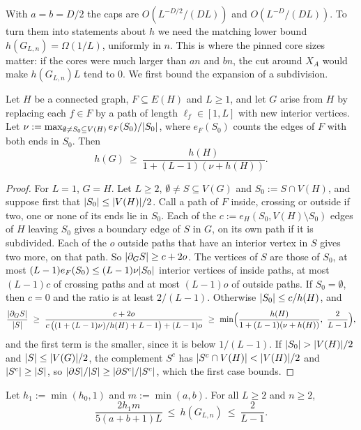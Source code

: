 With $a=b=D/2$ the caps are $O(L^{-D/2}/(DL))$ and $O(L^{-D}/(DL))$. To turn them into statements about $h$ we need the matching lower bound $h(G_{L,n})=\Omega(1/L)$, uniformly in $n$. This is where the pinned core sizes matter: if the cores were much larger than $an$ and $bn$, the cut around $X_A$ would make $h(G_{L,n})L$ tend to $0$. We first bound the expansion of a subdivision.

\begin{lemma}\label{lem:subdivide}
Let $H$ be a connected graph, $F\subseteq E(H)$ and $L\ge1$, and let $G$ arise from $H$ by replacing each $f\in F$ by a path of length $\ell_f\in[1,L]$ with new interior vertices. Let $\nu:=\max_{\emptyset\ne S_0\subseteq V(H)}e_F(S_0)/\lvert S_0\rvert$, where $e_F(S_0)$ counts the edges of $F$ with both ends in $S_0$. Then
\[
  h(G)\ \ge\ \frac{h(H)}{1+(L-1)(\nu+h(H))} .
\]
\end{lemma}

\begin{proof}
For $L=1$, $G=H$. Let $L\ge2$, $\emptyset\ne S\subseteq V(G)$ and $S_0:=S\cap V(H)$, and suppose first that $\lvert S_0\rvert\le\lvert V(H)\rvert/2$. Call a path of $F$ inside, crossing or outside if two, one or none of its ends lie in $S_0$. Each of the $c:=e_H(S_0,V(H)\setminus S_0)$ edges of $H$ leaving $S_0$ gives a boundary edge of $S$ in $G$, on its own path if it is subdivided. Each of the $o$ outside paths that have an interior vertex in $S$ gives two more, on that path. So $\lvert \partial_GS\rvert\ge c+2o$. The vertices of $S$ are those of $S_0$, at most $(L-1)e_F(S_0)\le(L-1)\nu\lvert S_0\rvert$ interior vertices of inside paths, at most $(L-1)c$ of crossing paths and at most $(L-1)o$ of outside paths. If $S_0=\emptyset$, then $c=0$ and the ratio is at least $2/(L-1)$. Otherwise $\lvert S_0\rvert\le c/h(H)$, and
\[
  \frac{\abs{\partial_GS}}{\abs S}\ \ge\ \frac{c+2o}{c\,\bigl((1+(L-1)\nu)/h(H)+L-1\bigr)+(L-1)o}\ \ge\ \min\Bigl(\frac{h(H)}{1+(L-1)(\nu+h(H))},\ \frac2{L-1}\Bigr),
\]
and the first term is the smaller, since it is below $1/(L-1)$. If $\lvert S_0\rvert>\lvert V(H)\rvert/2$ and $\lvert S\rvert\le\lvert V(G)\rvert/2$, the complement $S^c$ has $\lvert S^c\cap V(H)\rvert<\lvert V(H)\rvert/2$ and $\lvert S^c\rvert\ge\lvert S\rvert$, so $\lvert \partial S\rvert/\lvert S\rvert\ge\lvert \partial S^c\rvert/\lvert S^c\rvert$, which the first case bounds.
\end{proof}

\begin{proposition}\label{prop:hub-expansion}
Let $h_1:=\min(h_0,1)$ and $m:=\min(a,b)$. For all $L\ge2$ and $n\ge2$,
\[
  \frac{2h_1m}{5(a+b+1)L}\ \le\ h(G_{L,n})\ \le\ \frac2{L-1} .
\]
\end{proposition}

